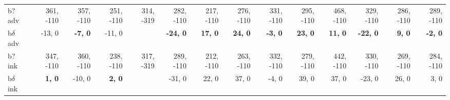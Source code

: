 \begin{table}[p]
{\begin{tabular}{lrrrrrrrrrrrrr}
b? adv & 361, -110 & 357, -110 & 251, -110 & 314, -319 & 282, -110 & 217, -110 & 276, -110 & 331, -110 & 295, -110 & 468, -110 & 329, -110 & 286, -110 & 289, -110 \\
b$\delta$ adv & -13, 0 & \textbf{-7, 0} & -11, 0 &  & \textbf{-24, 0} & \textbf{17, 0} & \textbf{24, 0} & \textbf{-3, 0} & \textbf{23, 0} & \textbf{11, 0} & \textbf{-22, 0} & \textbf{9, 0} & \textbf{-2, 0} \\
b? ink & 347, -110 & 360, -110 & 238, -110 & 317, -319 & 289, -110 & 212, -110 & 263, -110 & 332, -110 & 279, -110 & 442, -110 & 330, -110 & 269, -110 & 284, -110 \\
b$\delta$ ink & \textbf{1, 0} & -10, 0 & \textbf{2, 0} &  & -31, 0 & 22, 0 & 37, 0 & -4, 0 & 39, 0 & 37, 0 & -23, 0 & 26, 0 & 3, 0 \\

\end{tabular}
}
\end{table}
\clearpage
